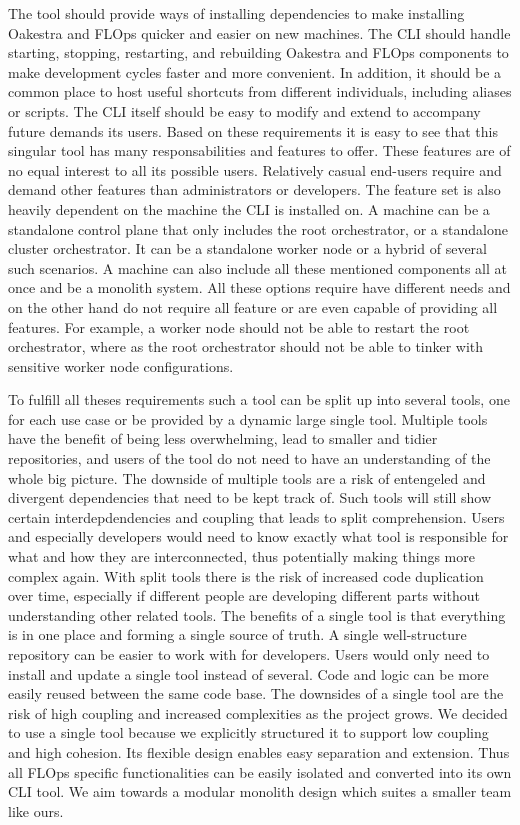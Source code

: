 The tool should provide ways of installing dependencies to make installing Oakestra and FLOps quicker and easier on new machines.
The CLI should handle starting, stopping, restarting, and rebuilding Oakestra and FLOps components to make development cycles faster and more convenient.
In addition, it should be a common place to host useful shortcuts from different individuals, including aliases or scripts.
The CLI itself should be easy to modify and extend to accompany future demands its users.
\vspace{5mm}
\newline
Based on these requirements it is easy to see that this singular tool has many responsabilities and features to offer.
These features are of no equal interest to all its possible users.
Relatively casual end-users require and demand other features than administrators or developers.
The feature set is also heavily dependent on the machine the CLI is installed on.
A machine can be a standalone control plane that only includes the root orchestrator, or a standalone cluster orchestrator.
It can be a standalone worker node or a hybrid of several such scenarios.
A machine can also include all these mentioned components all at once and be a monolith system.
All these options require have different needs and on the other hand do not require all feature or are even capable of providing all features.
For example, a worker node should not be able to restart the root orchestrator, where as the root orchestrator should not be able to tinker with sensitive worker node configurations.

To fulfill all theses requirements such a tool can be split up into several tools, one for each use case or be provided by a dynamic large single tool.
Multiple tools have the benefit of being less overwhelming, lead to smaller and tidier repositories, and users of the tool do not need to have an understanding of the whole big picture.
The downside of multiple tools are a risk of entengeled and divergent dependencies that need to be kept track of.
Such tools will still show certain interdepdendencies and coupling that leads to split comprehension.
Users and especially developers would need to know exactly what tool is responsible for what and how they are interconnected, thus potentially making things more complex again.
With split tools there is the risk of increased code duplication over time, especially if different people are developing different parts without understanding other related tools.
The benefits of a single tool is that everything is in one place and forming a single source of truth.
A single well-structure repository can be easier to work with for developers.
Users would only need to install and update a single tool instead of several.
Code and logic can be more easily reused between the same code base.
The downsides of a single tool are the risk of high coupling and increased complexities as the project grows.
We decided to use a single tool because we explicitly structured it to support low coupling and high cohesion.
Its flexible design enables easy separation and extension.
Thus all FLOps specific functionalities can be easily isolated and converted into its own CLI tool.
We aim towards a modular monolith design which suites a smaller team like ours.